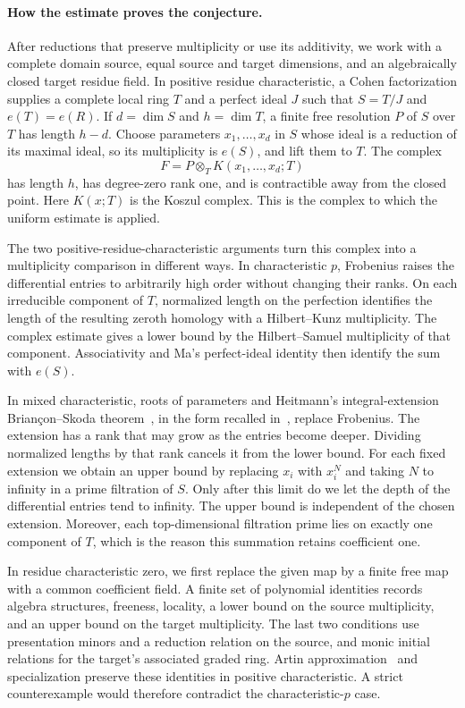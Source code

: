 \documentclass[11pt]{article}
\numberwithin{equation}{section}
\theoremstyle{definition}
\begin{document}
\paragraph{How the estimate proves the conjecture.}
After reductions that preserve multiplicity or use its additivity,
we work with a complete domain source, equal source and target
dimensions, and an algebraically closed target residue field.
In positive residue characteristic, a Cohen factorization supplies
a complete local ring $T$ and a perfect ideal $J$ such that
$S=T/J$ and $e(T)=e(R)$. If $d=\dim S$ and $h=\dim T$, a finite
free resolution $P$ of $S$ over $T$ has length $h-d$.
Choose parameters $x_1,\ldots,x_d$ in $S$ whose ideal is a reduction
of its maximal ideal, so its multiplicity is $e(S)$, and lift them
to $T$. The complex
\[
 F=P\otimes_T K(x_1,\ldots,x_d;T)
\]
has length $h$, has degree-zero rank one, and is contractible away
from the closed point. Here $K(x;T)$ is the Koszul complex.
This is the complex to which the uniform estimate is applied.

The two positive-residue-characteristic arguments turn this complex
into a multiplicity comparison in different ways. In characteristic
$p$, Frobenius raises the differential entries to arbitrarily high
order without changing their ranks. On each irreducible component
of $T$, normalized length on the perfection identifies the length of
the resulting zeroth homology with a Hilbert--Kunz multiplicity. The complex
estimate gives a lower bound by the Hilbert--Samuel multiplicity of
that component. Associativity and Ma's perfect-ideal identity then
identify the sum with $e(S)$.

In mixed characteristic, roots of parameters and Heitmann's
integral-extension Brian\c{c}on--Skoda theorem~\cite{Heitmann}, in
the form recalled in~\cite[Proposition~2.8]{HeitmannMa}, replace
Frobenius. The extension has a rank that may grow as the
entries become deeper. Dividing normalized lengths by that rank
cancels it from the lower bound. For each fixed extension we obtain
an upper bound by replacing $x_i$ with $x_i^N$ and taking $N$ to
infinity in a prime filtration of $S$. Only after this limit do we
let the depth of the differential entries tend to infinity.
The upper bound is independent of the chosen extension. Moreover,
each top-dimensional filtration prime lies on exactly one component
of $T$, which is the reason this summation retains coefficient one.

In residue characteristic zero, we first replace the given map by
a finite free map with a common coefficient field. A finite set of
polynomial identities records algebra structures, freeness,
locality, a lower bound on the source multiplicity, and an upper
bound on the target multiplicity. The last two conditions use
presentation minors and a reduction relation on the source, and
monic initial relations for the target's associated graded ring.
Artin approximation~\cite{Artin} and specialization preserve these identities
in positive characteristic. A strict counterexample would therefore
contradict the characteristic-$p$ case.
\end{document}
